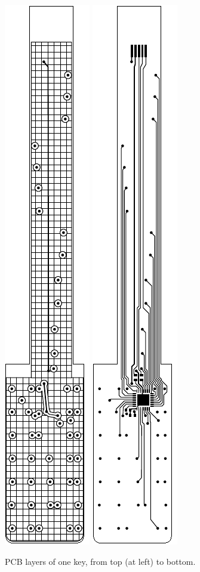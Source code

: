 \begin{figure}[t]
\includegraphics[width=0.18\columnwidth]{fig4c_touchkey-a_ly2.pdf}
\includegraphics[width=0.18\columnwidth]{fig4d_touchkey-a_ly1.pdf}
\caption{PCB layers of one key, from top (at left) to bottom.}
\label{McPherson:fig:layers}
\end{figure}

